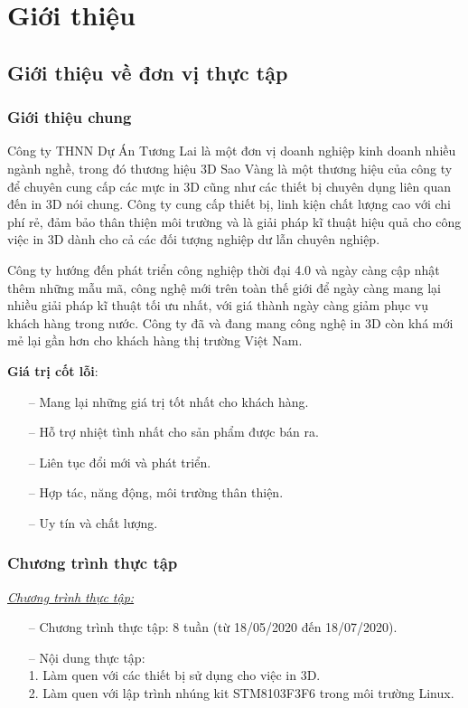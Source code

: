 \chapter{Giới thiệu}
\section{Giới thiệu về đơn vị thực tập}
\subsection{Giới thiệu chung}
Công ty THNN Dự Án Tương Lai là một đơn vị doanh nghiệp kinh doanh nhiều ngành nghề, trong đó thương hiệu 3D Sao Vàng là một thương hiệu của công ty để chuyên cung cấp các mực in 3D cũng như các thiết bị chuyên dụng liên quan đến in 3D nói chung.
Công ty cung cấp thiết bị, linh kiện chất lượng cao với chi phí rẻ, đảm bảo thân thiện môi trường và là giải pháp kĩ thuật hiệu quả cho công việc in 3D dành cho cả các đối tượng nghiệp dư lẫn chuyên nghiệp.

Công ty hướng đến phát triển công nghiệp thời đại 4.0 và ngày càng cập nhật thêm những mẫu mã, công nghệ mới trên toàn thế giới để ngày càng mang lại nhiều giải pháp kĩ thuật tối ưu nhất, với giá thành ngày càng giảm phục vụ khách hàng trong nước.
Công ty đã và đang mang công nghệ in 3D còn khá mới mẻ lại gần hơn cho khách hàng thị trường Việt Nam.

\bigskip
\textbf{Giá trị cốt lỗi}:
\begin{itemize}
\item[--] Mang lại những giá trị tốt nhất cho khách hàng.
\item[--] Hỗ trợ nhiệt tình nhất cho sản phẩm được bán ra.
\item[--] Liên tục đổi mới và phát triển.
\item[--] Hợp tác, năng động, môi trường thân thiện.
\item[--] Uy tín và chất lượng.
\end{itemize}

\subsection{Chương trình thực tập}
\underline{\textit{Chương trình thực tập:}}
\begin{itemize}
\item[--] Chương trình thực tập: 8 tuần (từ 18/05/2020 đến 18/07/2020).
\item[--] Nội dung thực tập:\\
1. Làm quen với các thiết bị sử dụng cho việc in 3D.\\
2. Làm quen với lập trình nhúng kit STM8103F3F6 trong môi trường Linux.
\end{itemize}

